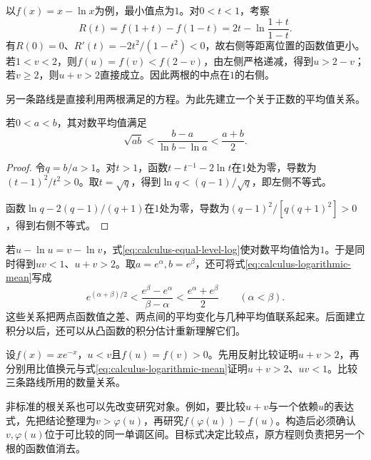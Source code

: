 以\(f(x)=x-\ln x\)为例，最小值点为\(1\)。对\(0<t<1\)，考察
\begin{equation*}
 R(t)=f(1+t)-f(1-t)
 =2t-\ln\frac{1+t}{1-t}.
\end{equation*}
有\(R(0)=0\)、\(R'(t)=-2t^2/(1-t^2)<0\)，故右侧等距离位置的函数值更小。若\(1<v<2\)，则\(f(u)=f(v)<f(2-v)\)，由左侧严格递减，得到\(u>2-v\)；若\(v\ge2\)，则\(u+v>2\)直接成立。因此两根的中点在\(1\)的右侧。

另一条路线是直接利用两根满足的方程。为此先建立一个关于正数的平均值关系。

\begingroup
\setlength{\parskip}{3pt}
\setlength{\abovedisplayskip}{8pt}
\setlength{\belowdisplayskip}{8pt}
\begin{proposition}\label{prop:calculus-logarithmic-mean}
若\(0<a<b\)，其对数平均值满足
\begin{equation}\label{eq:calculus-logarithmic-mean}
 \sqrt{ab}<\frac{b-a}{\ln b-\ln a}<\frac{a+b}{2}.
\end{equation}
\end{proposition}

\begin{samepage}
\begin{proof}
令\(q=b/a>1\)。对\(t>1\)，函数\(t-t^{-1}-2\ln t\)在\(1\)处为零，导数为\((t-1)^2/t^2>0\)。取\(t=\sqrt q\)，得到\(\ln q<(q-1)/\sqrt q\)，即左侧不等式。

函数\(\ln q-2(q-1)/(q+1)\)在\(1\)处为零，导数为\((q-1)^2/[q(q+1)^2]>0\)，得到右侧不等式。
\end{proof}
\end{samepage}
\endgroup
\newpage
若\(u-\ln u=v-\ln v\)，式\eqref{eq:calculus-equal-level-log}使对数平均值恰为\(1\)。于是同时得到\(uv<1\)、\(u+v>2\)。取\(a=e^\alpha,b=e^\beta\)，还可将式\eqref{eq:calculus-logarithmic-mean}写成
\begin{equation*}
 e^{(\alpha+\beta)/2}
 <\frac{e^\beta-e^\alpha}{\beta-\alpha}
 <\frac{e^\alpha+e^\beta}{2}\qquad(\alpha<\beta).
\end{equation*}
这些关系把两点函数值之差、两点间的平均变化与几种平均值联系起来。后面建立积分以后，还可以从凸函数的积分估计重新理解它们。

\begin{example}
设\(f(x)=xe^{-x}\)，\(u<v\)且\(f(u)=f(v)>0\)。先用反射比较证明\(u+v>2\)，再分别用比值换元与式\eqref{eq:calculus-logarithmic-mean}证明\(u+v>2\)、\(uv<1\)。比较三条路线所用的数量关系。
\end{example}

非标准的根关系也可以先改变研究对象。例如，要比较\(u+v\)与一个依赖\(u\)的表达式，先把结论整理为\(v>\varphi(u)\)，再研究\(f(\varphi(u))-f(u)\)。构造后必须确认\(v,\varphi(u)\)位于可比较的同一单调区间。目标式决定比较点，原方程则负责把另一个根的函数值消去。

